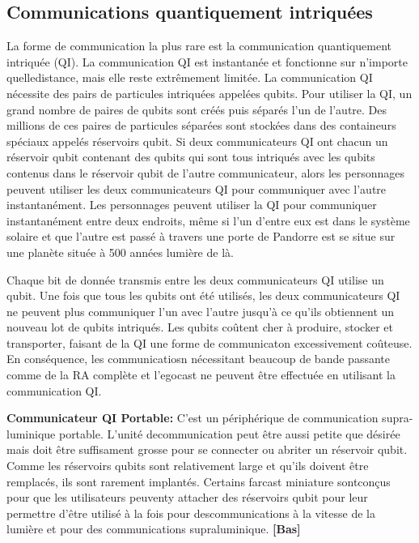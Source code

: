 \subsection{Communications quantiquement intriquées} \label{sec:quantum-entanglement-communication} 

La forme de communication la plus rare est la communication quantiquement intriquée (QI). La communication QI est instantanée et fonctionne sur n'importe quelledistance, mais elle reste extrêmement limitée. La communication QI nécessite des pairs de particules intriquées appelées qubits. Pour utiliser la QI, un grand nombre de paires de qubits sont créés puis séparés l'un de l'autre. Des millions de ces paires de particules séparées sont stockées dans des containeurs spéciaux appelés réservoirs qubit. Si deux communicateurs QI ont chacun un réservoir qubit contenant des qubits qui sont tous intriqués avec les qubits contenus dans le réservoir qubit de l'autre communicateur, alors les personnages peuvent utiliser les deux communicateurs QI pour communiquer avec l'autre instantanément. Les personnages peuvent utiliser la QI pour communiquer instantanément entre deux endroits, même si l'un d'entre eux est dans le système solaire et que l'autre est passé à travers une porte de Pandorre est se situe sur une planète située à 500 années lumière de là. 

Chaque bit de donnée transmis entre les deux communicateurs QI utilise un qubit. Une fois que tous les qubits ont été utilisés, les deux communicateurs QI ne peuvent plus communiquer l'un avec l'autre jusqu'à ce qu'ils obtiennent un nouveau lot de qubits intriqués. Les qubits coûtent cher à produire, stocker et transporter, faisant de la QI une forme de communicaton excessivement coûteuse. En conséquence, les communicatiosn nécessitant beaucoup de bande passante comme de la RA complète et l'egocast ne peuvent être effectuée en utilisant la communication QI. 

\textbf{Communicateur QI Portable:} C'est un périphérique de communication supra-luminique portable. L'unité decommunication peut être aussi petite que désirée mais doit être suffisament grosse pour se connecter ou abriter un réservoir qubit. Comme les réservoirs qubits sont relativement large et qu'ils doivent être remplacés, ils sont rarement implantés. Certains farcast miniature sontconçus pour que les utilisateurs peuventy attacher des réservoirs qubit pour leur permettre d'être utilisé à la fois pour descommunications à la vitesse de la lumière et pour des communications supraluminique. \textbf{[Bas]} 

